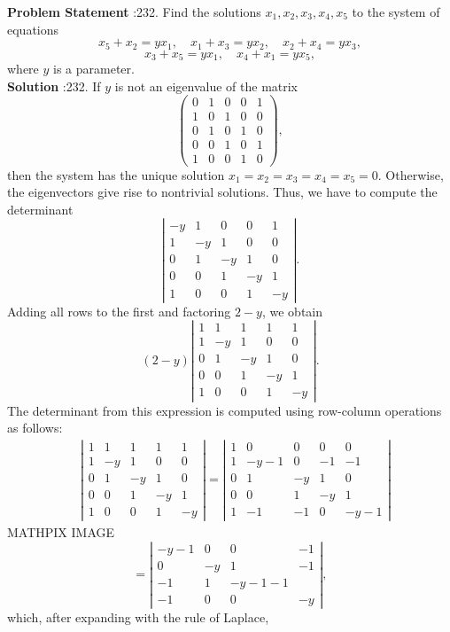\documentclass[10pt]{article}
\begin{document}
\textbf{Problem Statement} :232. Find the solutions $x_{1}, x_{2}, x_{3}, x_{4}, x_{5}$ to the system of equations$$ x_{5}+x_{2}=y x_{1}, \quad x_{1}+x_{3}=y x_{2}, \quad x_{2}+x_{4}=y x_{3}, $$$$ x_{3}+x_{5}=y x_{1}, \quad x_{4}+x_{1}=y x_{5}, $$where $y$ is a parameter.\\
\textbf{Solution} :232. If $y$ is not an eigenvalue of the matrix$$ \left(\begin{array}{lllll} 0 & 1 & 0 & 0 & 1 \\ 1 & 0 & 1 & 0 & 0 \\ 0 & 1 & 0 & 1 & 0 \\ 0 & 0 & 1 & 0 & 1 \\ 1 & 0 & 0 & 1 & 0 \end{array}\right), $$then the system has the unique solution $x_{1}=x_{2}=x_{3}=x_{4}=x_{5}=0$. Otherwise, the eigenvectors give rise to nontrivial solutions. Thus, we have to compute the determinant$$ \left|\begin{array}{ccccc} -y & 1 & 0 & 0 & 1 \\ 1 & -y & 1 & 0 & 0 \\ 0 & 1 & -y & 1 & 0 \\ 0 & 0 & 1 & -y & 1 \\ 1 & 0 & 0 & 1 & -y \end{array}\right| . $$Adding all rows to the first and factoring $2-y$, we obtain$$ (2-y)\left|\begin{array}{ccccc} 1 & 1 & 1 & 1 & 1 \\ 1 & -y & 1 & 0 & 0 \\ 0 & 1 & -y & 1 & 0 \\ 0 & 0 & 1 & -y & 1 \\ 1 & 0 & 0 & 1 & -y \end{array}\right| . $$The determinant from this expression is computed using row-column operations as follows:$$ \begin{aligned} & \left|\begin{array}{ccccc}1 & 1 & 1 & 1 & 1 \\1 & -y & 1 & 0 & 0 \\0 & 1 & -y & 1 & 0 \\0 & 0 & 1 & -y & 1 \\1 & 0 & 0 & 1 & -y\end{array}\right|=\left|\begin{array}{ccccc}1 & 0 & 0 & 0 & 0 \\1 & -y-1 & 0 & -1 & -1 \\0 & 1 & -y & 1 & 0 \\0 & 0 & 1 & -y & 1 \\1 & -1 & -1 & 0 & -y-1\end{array}\right| \end{aligned} $$MATHPIX IMAGE$$ =\left|\begin{array}{cccc} -y-1 & 0 & 0 & -1 \\ 0 & -y & 1 & -1 \\ -1 & 1 & -y-1-1 \\ -1 & 0 & 0 & -y \end{array}\right|, $$which, after expanding with the rule of Laplace, 
\end{document}
